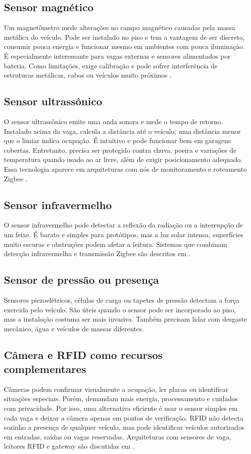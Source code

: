 \documentclass[11pt,a4paper]{article}
\begin{document}
\subsection{Sensor magnético}
Um magnetômetro mede alterações no campo magnético causadas pela massa metálica do veículo. Pode ser instalado no piso e tem a vantagem de ser discreto, consumir pouca energia e funcionar mesmo em ambientes com pouca iluminação. É especialmente interessante para vagas externas e sensores alimentados por bateria. Como limitações, exige calibração e pode sofrer interferência de estruturas metálicas, cabos ou veículos muito próximos \cite{chen2016}.

\subsection{Sensor ultrassônico}
O sensor ultrassônico emite uma onda sonora e mede o tempo de retorno. Instalado acima da vaga, calcula a distância até o veículo; uma distância menor que o limiar indica ocupação. É intuitivo e pode funcionar bem em garagens cobertas. Entretanto, precisa ser protegido contra chuva, poeira e variações de temperatura quando usado ao ar livre, além de exigir posicionamento adequado. Essa tecnologia aparece em arquiteturas com nós de monitoramento e roteamento Zigbee \cite{hilmani2018}.

\subsection{Sensor infravermelho}
O sensor infravermelho pode detectar a reflexão da radiação ou a interrupção de um feixe. É barato e simples para protótipos, mas a luz solar intensa, superfícies muito escuras e obstruções podem afetar a leitura. Sistemas que combinam detecção infravermelha e transmissão Zigbee são descritos em \cite{hilmani2018}.

\subsection{Sensor de pressão ou presença}
Sensores piezoelétricos, células de carga ou tapetes de pressão detectam a força exercida pelo veículo. São úteis quando o sensor pode ser incorporado ao piso, mas a instalação costuma ser mais invasiva. Também precisam lidar com desgaste mecânico, água e veículos de massas diferentes.

\subsection{Câmera e RFID como recursos complementares}
Câmeras podem confirmar visualmente a ocupação, ler placas ou identificar situações especiais. Porém, demandam mais energia, processamento e cuidados com privacidade. Por isso, uma alternativa eficiente é usar o sensor simples em cada vaga e deixar a câmera apenas em pontos de verificação. RFID não detecta sozinho a presença de qualquer veículo, mas pode identificar veículos autorizados em entradas, saídas ou vagas reservadas. Arquiteturas com sensores de vaga, leitores RFID e gateway são discutidas em \cite{bagula2015,hilmani2018}.
\end{document}
